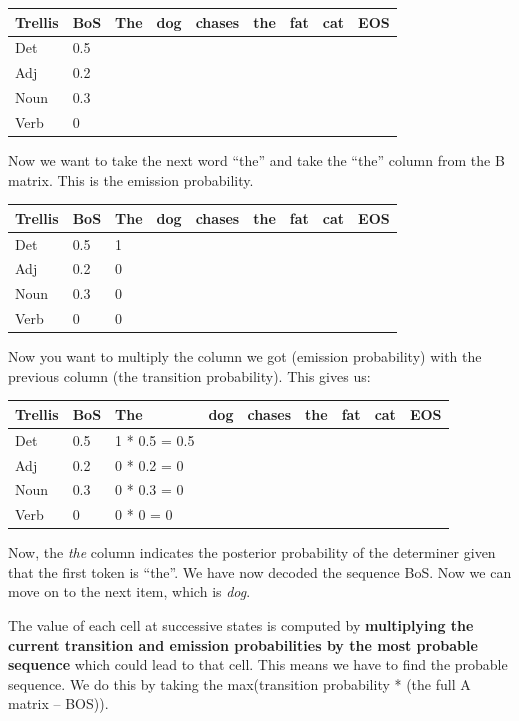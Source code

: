 \documentclass[
  11pt,
  british,
]{article}
\begin{document}
\begin{longtable}[]{@{}lllllllll@{}}
\toprule
Trellis & BoS & The & dog & chases & the & fat & cat & EOS \\
\midrule
\endhead
Det & 0.5 & & & & & & & \\
Adj & 0.2 & & & & & & & \\
Noun & 0.3 & & & & & & & \\
Verb & 0 & & & & & & & \\
\bottomrule
\end{longtable}

Now we want to take the next word ``the'' and take the ``the'' column
from the B matrix. This is the emission probability.

\begin{longtable}[]{@{}lllllllll@{}}
\toprule
Trellis & BoS & The & dog & chases & the & fat & cat & EOS \\
\midrule
\endhead
Det & 0.5 & 1 & & & & & & \\
Adj & 0.2 & 0 & & & & & & \\
Noun & 0.3 & 0 & & & & & & \\
Verb & 0 & 0 & & & & & & \\
\bottomrule
\end{longtable}

Now you want to multiply the column we got (emission probability) with
the previous column (the transition probability). This gives us:

\begin{longtable}[]{@{}lllllllll@{}}
\toprule
Trellis & BoS & The & dog & chases & the & fat & cat & EOS \\
\midrule
\endhead
Det & 0.5 & 1 * 0.5 = 0.5 & & & & & & \\
Adj & 0.2 & 0 * 0.2 = 0 & & & & & & \\
Noun & 0.3 & 0 * 0.3 = 0 & & & & & & \\
Verb & 0 & 0 * 0 = 0 & & & & & & \\
\bottomrule
\end{longtable}

Now, the \emph{the} column indicates the posterior probability of the
determiner given that the first token is ``the''. We have now decoded
the sequence BoS. Now we can move on to the next item, which is
\emph{dog}.

The value of each cell at successive states is computed by
\textbf{multiplying the current transition and emission probabilities by
the most probable sequence} which could lead to that cell. This means we
have to find the probable sequence. We do this by taking the
max(transition probability * (the full A matrix -- BOS)).
\end{document}
